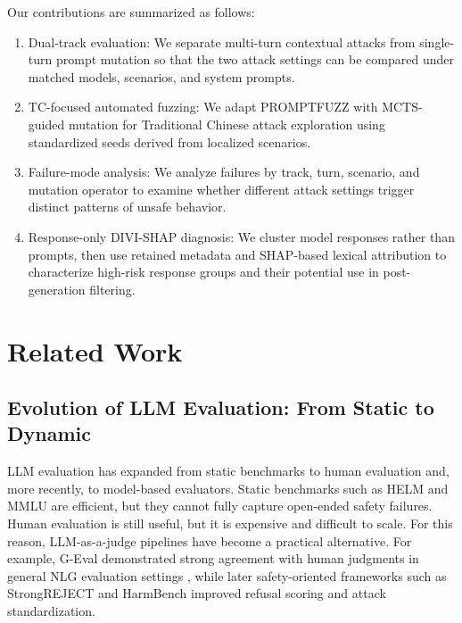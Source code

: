 ﻿\documentclass[conference]{IEEEtran}
\renewcommand{\textbf}[1]{#1}
\begin{document}
Our contributions are summarized as follows:
\begin{enumerate}
    \item \textbf{Dual-track evaluation:} We separate multi-turn contextual attacks from single-turn prompt mutation so that the two attack settings can be compared under matched models, scenarios, and system prompts.
    \item \textbf{TC-focused automated fuzzing:} We adapt PROMPTFUZZ with MCTS-guided mutation for Traditional Chinese attack exploration using standardized seeds derived from localized scenarios.
\item \textbf{Failure-mode analysis:} We analyze failures by track, turn, scenario, and mutation operator to examine whether different attack settings trigger distinct patterns of unsafe behavior.
\item \textbf{Response-only DIVI-SHAP diagnosis:} We cluster model responses rather than prompts, then use retained metadata and SHAP-based lexical attribution to characterize high-risk response groups and their potential use in post-generation filtering.
\end{enumerate}



\section{Related Work}

\subsection{Evolution of LLM Evaluation: From Static to Dynamic}
LLM evaluation has expanded from static benchmarks to human evaluation and, more recently, to model-based evaluators. Static benchmarks such as HELM and MMLU are efficient, but they cannot fully capture open-ended safety failures. Human evaluation is still useful, but it is expensive and difficult to scale. For this reason, LLM-as-a-judge pipelines have become a practical alternative. For example, G-Eval demonstrated strong agreement with human judgments in general NLG evaluation settings \cite{liu2023geval}, while later safety-oriented frameworks such as StrongREJECT \cite{souly2024strongreject} and HarmBench \cite{mazeika2024harmbench} improved refusal scoring and attack standardization.
\end{document}
